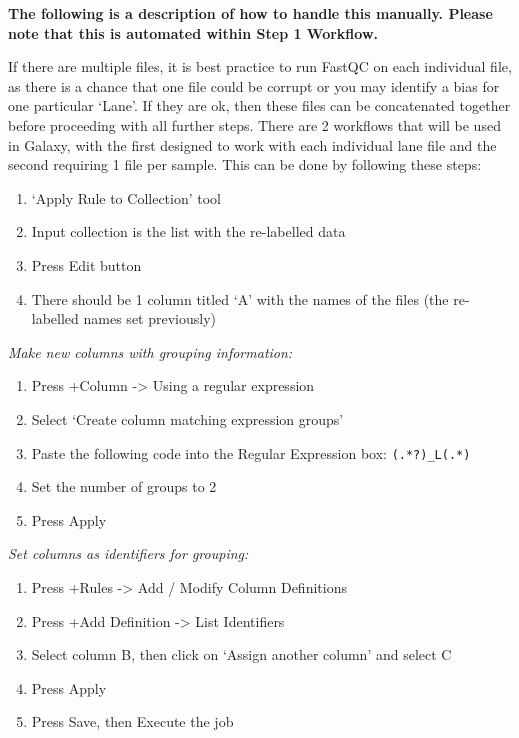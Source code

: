 \documentclass[
]{book}
\providecommand{\tightlist}{%
  \setlength{\itemsep}{0pt}\setlength{\parskip}{0pt}}
\begin{document}
\textbf{The following is a description of how to handle this manually. Please note that this is automated within Step 1 Workflow.}

If there are multiple files, it is best practice to run FastQC on each individual file, as there is a chance that one file could be corrupt or you may identify a bias for one particular `Lane'. If they are ok, then these files can be concatenated together before proceeding with all further steps. There are 2 workflows that will be used in Galaxy, with the first designed to work with each individual lane file and the second requiring 1 file per sample. This can be done by following these steps:

\begin{enumerate}
\def\labelenumi{\arabic{enumi}.}
\tightlist
\item
  `Apply Rule to Collection' tool
\item
  Input collection is the list with the re-labelled data
\item
  Press Edit button
\item
  There should be 1 column titled `A' with the names of the files (the re-labelled names set previously)
\end{enumerate}

\emph{Make new columns with grouping information:}

\begin{enumerate}
\def\labelenumi{\arabic{enumi}.}
\setcounter{enumi}{4}
\tightlist
\item
  Press +Column -\textgreater{} Using a regular expression
\item
  Select `Create column matching expression groups'
\item
  Paste the following code into the Regular Expression box: \texttt{(.*?)\_L(.*)}
\item
  Set the number of groups to 2
\item
  Press Apply
\end{enumerate}

\emph{Set columns as identifiers for grouping:}

\begin{enumerate}
\def\labelenumi{\arabic{enumi}.}
\setcounter{enumi}{9}
\tightlist
\item
  Press +Rules -\textgreater{} Add / Modify Column Definitions
\item
  Press +Add Definition -\textgreater{} List Identifiers
\item
  Select column B, then click on `Assign another column' and select C
\item
  Press Apply
\item
  Press Save, then Execute the job
\end{enumerate}
\end{document}

